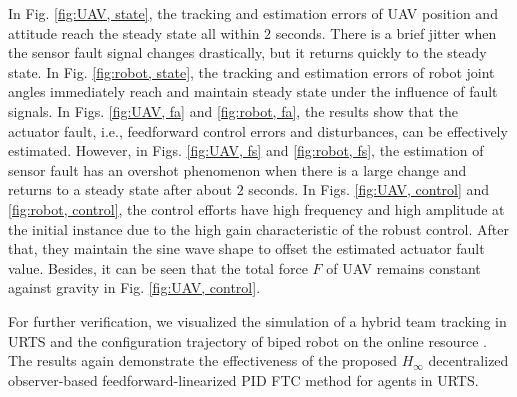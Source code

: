 \documentclass{ieeeaccess}
\begin{document}
In Fig. \ref{fig:UAV, state}, the tracking and estimation errors of UAV position and attitude reach the steady state all within $2$ seconds. There is a brief jitter when the sensor fault signal changes drastically, but it returns quickly to the steady state. In Fig. \ref{fig:robot, state}, the tracking and estimation errors of robot joint angles immediately reach and maintain steady state under the influence of fault signals. In Figs. \ref{fig:UAV, fa} and \ref{fig:robot, fa}, the results show that the actuator fault, i.e., feedforward control errors and disturbances, can be effectively estimated. However, in Figs. \ref{fig:UAV, fs} and \ref{fig:robot, fs}, the estimation of sensor fault has an overshot phenomenon when there is a large change and returns to a steady state after about $2$ seconds. In Figs. \ref{fig:UAV, control} and \ref{fig:robot, control}, the control efforts have high frequency and high amplitude at the initial instance due to the high gain characteristic of the robust control. After that, they maintain the sine wave shape to offset the estimated actuator fault value. Besides, it can be seen that the total force $F$ of UAV remains constant against gravity in Fig. \ref{fig:UAV, control}.

For further verification, we visualized the simulation of a hybrid team tracking in URTS and the configuration trajectory of biped robot on the online resource \cite{mySimulation}. The results again demonstrate the effectiveness of the proposed $H_\infty$ decentralized observer-based feedforward-linearized PID FTC method for agents in URTS.
\end{document}
